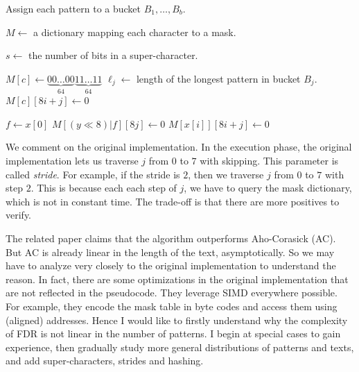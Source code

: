 \begin{algorithm}[H]
  \caption{Compilation phase of the FDR string matcher}
  \label{alg:compilation-super}
  \begin{algorithmic}[1]
    \State Assign each pattern to a bucket $B_1,\ldots,B_b$.

    \State $M\gets$  a dictionary mapping each character to a mask.

    \State \textcolor{gustave}{$s\gets$ the number of bits in a super-character.}

    \State $M[c] \gets \underbrace{00\ldots00}_{64}\underbrace{11\ldots11}_{64}$ 
    \State $\ell_j\gets$ length of the longest pattern in bucket $B_j$.
    \State $M[c][8i+j] \gets 0$ 
    \EndFor
    \EndFor
    \EndFor

    \State \textcolor{gustave}{$f\gets x[0]$} \Comment{\textcolor{gustave}{Handle the end character.}}
    \State \textcolor{gustave}{$M[(y\ll 8) | f][8j] \gets 0$}
    \EndFor
    \State $M[x[i]][8i+j] \gets 0$
    \EndFor
    \EndFor
    \EndFor
  \end{algorithmic}
\end{algorithm}

We comment on the original implementation. In the execution phase, the original implementation lets us traverse $j$ from $0$ to $7$ with skipping. This parameter is called \textit{stride}. For example, if the stride is $2$, then we traverse $j$ from $0$ to $7$ with step $2$. This is because each each step of $j$, we have to query the mask dictionary, which is not in constant time. The trade-off is that there are more positives to verify.

The related paper \cite{wang2019hyperscan} claims that the algorithm outperforms Aho-Corasick (AC). But AC is already linear in the length of the text, asymptotically. So we may have to analyze very closely to the original implementation to understand the reason. In fact, there are some optimizations in the original implementation that are not reflected in the pseudocode. They leverage SIMD everywhere possible. For example, they encode the mask table in byte codes and access them using (aligned) addresses. Hence I would like to firstly understand why the complexity of FDR is not linear in the number of patterns. I begin at special cases to gain experience, then gradually study more general distributions of patterns and texts, and add super-characters, strides and hashing.


